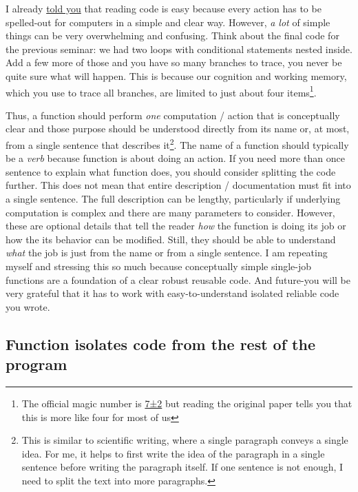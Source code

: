 \documentclass[
]{book}
\begin{document}
I already \protect\hyperlink{programming-tips}{told you} that reading code is easy because every action has to be spelled-out for computers in a simple and clear way. However, \emph{a lot} of simple things can be very overwhelming and confusing. Think about the final code for the previous seminar: we had two loops with conditional statements nested inside. Add a few more of those and you have so many branches to trace, you never be quite sure what will happen. This is because our cognition and working memory, which you use to trace all branches, are limited to just about four items\footnote{The official magic number is \href{https://en.wikipedia.org/wiki/The_Magical_Number_Seven,_Plus_or_Minus_Two}{7±2} but reading the original paper tells you that this is more like four for most of us}.

Thus, a function should perform \emph{one} computation / action that is conceptually clear and those purpose should be understood directly from its name or, at most, from a single sentence that describes it\footnote{This is similar to scientific writing, where a single paragraph conveys a single idea. For me, it helps to first write the idea of the paragraph in a single sentence before writing the paragraph itself. If one sentence is not enough, I need to split the text into more paragraphs.}. The name of a function should typically be a \emph{verb} because function is about doing an action. If you need more than once sentence to explain what function does, you should consider splitting the code further. This does not mean that entire description / documentation must fit into a single sentence. The full description can be lengthy, particularly if underlying computation is complex and there are many parameters to consider. However, these are optional details that tell the reader \emph{how} the function is doing its job or how the its behavior can be modified. Still, they should be able to understand \emph{what} the job is just from the name or from a single sentence. I am repeating myself and stressing this so much because conceptually simple single-job functions are a foundation of a clear robust reusable code. And future-you will be very grateful that it has to work with easy-to-understand isolated reliable code you wrote.

\hypertarget{function-isolates-code-from-the-rest-of-the-program}{%
\subsection{Function isolates code from the rest of the program}\label{function-isolates-code-from-the-rest-of-the-program}}
\end{document}
